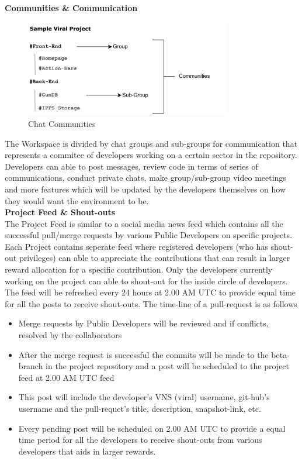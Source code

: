 \documentclass[conference]{IEEEtran}
\begin{document}
\textbf{Communities \& Communication}\\

\begin{figure}[H]
\begin{center}
\includegraphics[width=9cm]{chat-community}
\caption{Chat Communities}
\end{center}
\end{figure}

The Workspace is divided by chat groups and sub-groups for communication that represents a commitee of developers working on a certain sector in the repository. Developers can able to post messages, review code in terms of series of communications, conduct private chats, make group/sub-group video meetings and more features which will be updated by the developers themselves on how they would want the environment to be.\\

\textbf{Project Feed \& Shout-outs}\\

The Project Feed is similar to a social media news feed which contains all the successful pull/merge requests by various Public Developers on specific projects. Each Project contains seperate feed where registered developers (who has shout-out privileges) can able to appreciate the contributions that can result in larger reward allocation for a specific contribution. Only the developers currently working on the project can able to shout-out for the inside circle of developers. The feed will be refreshed every 24 hours at 2.00 AM UTC to provide equal time for all the posts to receive shout-outs. The time-line of a pull-request is as follows
\begin{itemize}[wide, labelwidth=!, labelindent=0pt]
\item Merge requests by Public Developers will be reviewed and if conflicts, resolved by the collaborators
\item After the merge request is successful the commits will be made to the beta-branch in the project repository and a post will be scheduled to the project feed at 2.00 AM UTC feed
\item This post will include the developer's VNS (viral) username, git-hub's username and the pull-requet's title, description, snapshot-link, etc.
\item Every pending post will be scheduled on 2.00 AM UTC to provide a equal time period for all the developers to  receive shout-outs from various developers that aids in larger rewards. 
\end{itemize}
\end{document}
